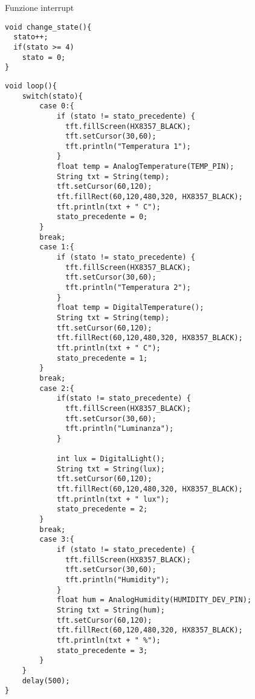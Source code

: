 Funzione interrupt
\begin{lstlisting}[frame=single, language=Arduino]
void change_state(){
  stato++;
  if(stato >= 4)
    stato = 0;
}
\end{lstlisting}
\begin{lstlisting}[frame=single, language=Arduino]
void loop(){
    switch(stato){
        case 0:{
            if (stato != stato_precedente) {
              tft.fillScreen(HX8357_BLACK);
              tft.setCursor(30,60);
              tft.println("Temperatura 1");
            }
            float temp = AnalogTemperature(TEMP_PIN);
            String txt = String(temp);
            tft.setCursor(60,120);
            tft.fillRect(60,120,480,320, HX8357_BLACK);
            tft.println(txt + " C");
            stato_precedente = 0;
        }
        break;
        case 1:{
            if (stato != stato_precedente) {
              tft.fillScreen(HX8357_BLACK);
              tft.setCursor(30,60);
              tft.println("Temperatura 2");
            }
            float temp = DigitalTemperature();
            String txt = String(temp);
            tft.setCursor(60,120);
            tft.fillRect(60,120,480,320, HX8357_BLACK);
            tft.println(txt + " C");
            stato_precedente = 1;
        }
        break;
        case 2:{
            if(stato != stato_precedente) {
              tft.fillScreen(HX8357_BLACK);
              tft.setCursor(30,60);
              tft.println("Luminanza");
            }
        
            int lux = DigitalLight();
            String txt = String(lux);
            tft.setCursor(60,120);
            tft.fillRect(60,120,480,320, HX8357_BLACK);
            tft.println(txt + " lux");
            stato_precedente = 2;
        }
        break;
        case 3:{
            if (stato != stato_precedente) {
              tft.fillScreen(HX8357_BLACK);
              tft.setCursor(30,60);
              tft.println("Humidity");
            }
            float hum = AnalogHumidity(HUMIDITY_DEV_PIN);
            String txt = String(hum);
            tft.setCursor(60,120);
            tft.fillRect(60,120,480,320, HX8357_BLACK);
            tft.println(txt + " %");
            stato_precedente = 3;
        }
    }
    delay(500);
}
\end{lstlisting}
\clearpage
